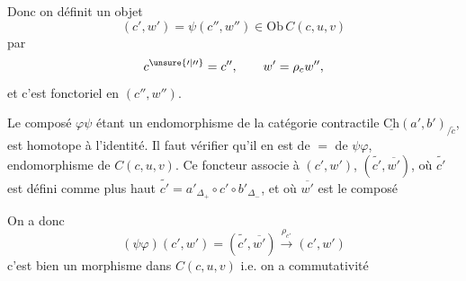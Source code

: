  Donc on définit un objet 
\[
(c',w')=\psi(c'',w'')\in\mathrm{Ob}\,C(c,u,v)
\]
par
\[
c^{\unsure{\prime|\prime\prime}}=c'',\qquad w'=\rho_c w'',
\]
et c'est fonctoriel en $(c'',w'')$.

Le composé $\varphi\psi$ étant un endomorphisme de la catégorie contractile $\underline{\mathrm{Ch}}(a',b')_{/\widetilde c}$, est homotope à l'identité. Il faut vérifier qu'il en est de $=$ de $\psi\varphi$, endomorphisme de $C(c,u,v)$. Ce foncteur associe à $(c',w')$, $(\widetilde{c'},\overline{w'})$, où $\widetilde{c'}$ est défini comme plus haut $\widetilde{c'}=a'_{\Delta_+}\circ c'\circ b'_{\Delta_-}$, et où $\overline{w'}$ est le composé

On a donc
\[
(\psi\varphi)(c',w')=(\widetilde{c'},\overline{w'})\xrightarrow{\rho_{c'}}(c',w')
\]
c'est bien un morphisme dans $C(c,u,v)$ i.e. on a commutativité 
